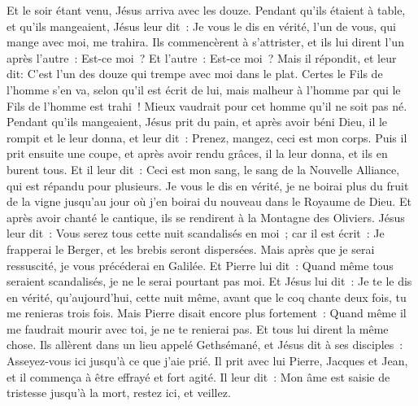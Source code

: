 \begin{multicols}{2}
Et le soir étant venu, Jésus arriva avec les douze.
Pendant qu'ils étaient à table, et qu'ils mangeaient, Jésus leur dit~: Je vous le dis en vérité, l'un de vous, qui mange avec moi, me trahira.
Ils commencèrent à s'attrister, et ils lui dirent l'un après l'autre~: Est-ce moi~? Et l'autre~: Est-ce moi~?
Mais il répondit, et leur dit: C'est l'un des douze qui trempe avec moi dans le plat.
Certes le Fils de l'homme s'en va, selon qu'il est écrit de lui, mais malheur à l'homme par qui le Fils de l'homme est trahi~! Mieux vaudrait pour cet homme qu'il ne soit pas né.
Pendant qu'ils mangeaient, Jésus prit du pain, et après avoir béni Dieu, il le rompit et le leur donna, et leur dit~: Prenez, mangez, ceci est mon corps.
Puis il prit ensuite une coupe, et après avoir rendu grâces, il la leur donna, et ils en burent tous.
Et il leur dit~: Ceci est mon sang, le sang de la Nouvelle Alliance, qui est répandu pour plusieurs.
Je vous le dis en vérité, je ne boirai plus du fruit de la vigne jusqu'au jour où j'en boirai du nouveau dans le Royaume de Dieu.
Et après avoir chanté le cantique, ils se rendirent à la Montagne des Oliviers.
Jésus leur dit~: Vous serez tous cette nuit scandalisés en moi~; car il est écrit~: Je frapperai le Berger, et les brebis seront dispersées.
Mais après que je serai ressuscité, je vous précéderai en Galilée.
Et Pierre lui dit~: Quand même tous seraient scandalisés, je ne le serai pourtant pas moi.
Et Jésus lui dit~: Je te le dis en vérité, qu'aujourd'hui, cette nuit même, avant que le coq chante deux fois, tu me renieras trois fois.
Mais Pierre disait encore plus fortement~: Quand même il me faudrait mourir avec toi, je ne te renierai pas. Et tous lui dirent la même chose.
Ils allèrent dans un lieu appelé Gethsémané, et Jésus dit à ses disciples~: Asseyez-vous ici jusqu'à ce que j'aie prié.
Il prit avec lui Pierre, Jacques et Jean, et il commença à être effrayé et fort agité.
Il leur dit~: Mon âme est saisie de tristesse jusqu'à la mort, restez ici, et veillez.

\end{multicols}
